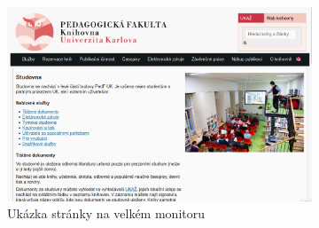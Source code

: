 \documentclass{csbulletin}
\begin{document}
\begin{figure}[htbp]
  \caption{Ukázka zobrazení webové stránky s využitím responzivního designu}
  \label{fig:responzivni}
\begin{subfigure}[t]{0.74\textwidth}
    \includegraphics[width=\textwidth]{img/pedf-web-big.png}
    \caption{Ukázka stránky na velkém monitoru}
\end{subfigure}
\hfill
\begin{subfigure}[t]{0.24\textwidth}

\end{subfigure}
\end{figure}
\end{document}

